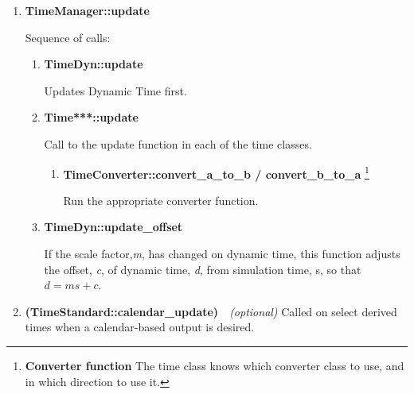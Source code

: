 {\begin{enumerate}  %
\item \textbf{TimeManager::update}\par
Sequence of calls:

{\begin{enumerate}  %
\item \textbf{TimeDyn::update}\par
Updates Dynamic Time first.

\item \textbf{Time***::update}\par
Call to the update function in each of the time classes.

{\begin{enumerate}  %
\item \textbf{TimeConverter::convert\_a\_to\_b / convert\_b\_to\_a}
{\footnote{{\bf Converter function}\newline
The time class knows which converter class to use, and in which
direction to use it.}}   \par

Run the appropriate converter function.

\end{enumerate}}   %

\item \textbf{TimeDyn::update\_offset}\par
If the scale factor,\textit{m}, has changed on dynamic time,
this function adjusts the offset, \textit{c}, of dynamic time,
\textit{d}, from simulation time, s, so that $d=ms+c$.
\end{enumerate}}  %

\item \textbf{(TimeStandard::calendar\_update)}\ \ \textit{(optional)  }
Called on select derived times when a calendar-based output is desired.

\end{enumerate}}  %


